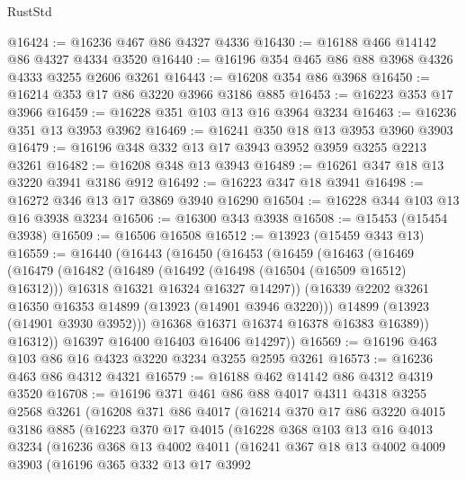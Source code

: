 \begin{lexlean}{RustStd}
\begin{coremodule}
{\begin{coremodule}
{{{{{{{{{{{{{{{{{{{{{{{{{{{{{{{{{{{{{@16424 := @16236 @467 @86 @4327 @4336
@16430 := @16188 @466 @14142 @86 @4327 @4334 @3520
@16440 := @16196 @354 @465 @86 @88 @3968 @4326 @4333 @3255 @2606 @3261
@16443 := @16208 @354 @86 @3968
@16450 := @16214 @353 @17 @86 @3220 @3966 @3186 @885
@16453 := @16223 @353 @17 @3966
@16459 := @16228 @351 @103 @13 @16 @3964 @3234
@16463 := @16236 @351 @13 @3953 @3962
@16469 := @16241 @350 @18 @13 @3953 @3960 @3903
@16479 := @16196 @348 @332 @13 @17 @3943 @3952 @3959 @3255 @2213 @3261
@16482 := @16208 @348 @13 @3943
@16489 := @16261 @347 @18 @13 @3220 @3941 @3186 @912
@16492 := @16223 @347 @18 @3941
@16498 := @16272 @346 @13 @17 @3869 @3940 @16290
@16504 := @16228 @344 @103 @13 @16 @3938 @3234
@16506 := @16300 @343 @3938
@16508 := @15453 (@15454 @3938)
@16509 := @16506 @16508
@16512 := @13923 (@15459 @343 @13)
@16559 := @16440
    (@16443
      (@16450
        (@16453
          (@16459
            (@16463
              (@16469
                (@16479
                  (@16482
                    (@16489
                      (@16492 (@16498 (@16504 (@16509 @16512) @16312)))
                      @16318
                      @16321
                      @16324
                      @16327
                      @14297))
                  (@16339 @2202 @3261 @16350 @16353 @14899 (@13923 (@14901 @3946 @3220)))
                  @14899
                  (@13923 (@14901 @3930 @3952)))
                @16368
                @16371
                @16374
                @16378
                @16383
                @16389))
            @16312))
        @16397
        @16400
        @16403
        @16406
        @14297))
@16569 := @16196 @463 @103 @86 @16 @4323 @3220 @3234 @3255 @2595 @3261
@16573 := @16236 @463 @86 @4312 @4321
@16579 := @16188 @462 @14142 @86 @4312 @4319 @3520
@16708 := @16196
    @371
    @461
    @86
    @88
    @4017
    @4311
    @4318
    @3255
    @2568
    @3261
    (@16208
      @371
      @86
      @4017
      (@16214
        @370
        @17
        @86
        @3220
        @4015
        @3186
        @885
        (@16223
          @370
          @17
          @4015
          (@16228
            @368
            @103
            @13
            @16
            @4013
            @3234
            (@16236
              @368
              @13
              @4002
              @4011
              (@16241
                @367
                @18
                @13
                @4002
                @4009
                @3903
                (@16196
                  @365
                  @332
                  @13
                  @17
                  @3992
}}}}}}}}}}}}}}}}}}}}}}}}}}}}}}}}}}}}}
\end{coremodule}}
\end{coremodule}
\end{lexlean}

